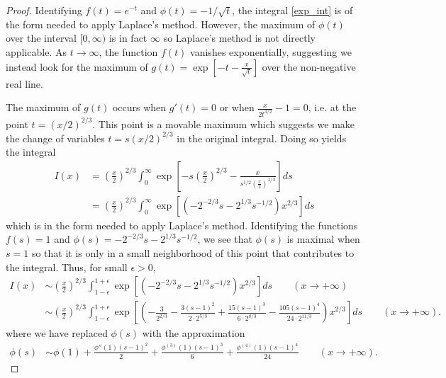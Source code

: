 \documentclass[12pt]{article}
\theoremstyle{definition}
\begin{document}
\begin{proof}
  Identifying $f(t) = e^{-t}$ and $\phi(t) = -1/\sqrt{t}$, the integral \eqref{exp_int} is of
  the form needed to apply Laplace's method. However, the maximum of $\phi(t)$ over the interval $[0, \infty)$
  is in fact $\infty$ so Laplace's method is not directly applicable.
  As $t\to \infty$, the function $f(t)$ vanishes exponentially, suggesting we instead look for the maximum
  of $g(t) = \exp\left[-t - \frac{x}{\sqrt{t}}\right]$ over the non-negative real line.

  The maximum of $g(t)$ occurs when $g'(t)=0$ or when $\frac{x}{2t^{3/2}} - 1 = 0$, i.e. at the point $t = (x/2)^{2/3}$.
  This point is a movable maximum which suggests we make the change of variables $t=s(x/2)^{2/3}$ in the original integral.
  Doing so yields the integral
  \begin{align*}
    I(x) &= \left(\frac{x}{2}\right)^{2/3}\int_0^\infty \exp\left[-s\left(\frac{x}{2}\right)^{2/3} - \frac{x}{s^{1/2}\left(\frac{x}{2}\right)^{1/3}}\right]ds\\
    &= \left(\frac{x}{2}\right)^{2/3}\int_0^\infty \exp\left[ \left(-2^{-2/3}s-2^{1/3}s^{-1/2}\right)x^{2/3}\right]ds
  \end{align*}
  which is in the form needed to apply Laplace's method.
  Identifying the functions $f(s) = 1$ and $\phi(s) = -2^{-2/3}s-2^{1/3}s^{-1/2}$, we see that $\phi(s)$ is maximal when $s=1$ so that it is only
  in a small neighborhood of this point that contributes to the integral. Thus, for small $\epsilon > 0$,
  \begin{align*}
    I(x) &\sim \left(\frac{x}{2}\right)^{2/3}\int_{1-\epsilon}^{1+\epsilon} \exp\left[ \left(-2^{-2/3}s-2^{1/3}s^{-1/2}\right)x^{2/3}\right]ds \qquad (x\to +\infty) \\
    &\sim \left(\frac{x}{2}\right)^{2/3}\int_{1-\epsilon}^{1+\epsilon} \exp\left[ \left(-\frac{3}{2^{2/3}}-\frac{3(s-1)^2}{2\cdot2^{5/3}} + \frac{15(s-1)^3}{6\cdot2^{8/3}} - \frac{105(s-1)^4}{24\cdot2^{11/3}} \right)x^{2/3}\right]ds \qquad (x\to +\infty).
  \end{align*}
  where we have replaced $\phi(s)$ with the approximation
  \begin{align*}
    \phi(s) &\sim \phi(1) + \frac{\phi''(1)(s-1)^2}{2} + \frac{\phi^{(3)}(1)(s-1)^3}{6} + \frac{\phi^{(4)}(1)(s-1)^4}{24} \qquad (x \to +\infty).
  \end{align*}
\end{proof}
\newpage
\end{document}
